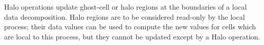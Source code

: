 

Halo operations update ghost-cell or halo regions at the boundaries
of a local data decomposition.  Halo regions are to be considered
read-only by the local process; their data values can be used to
compute the new values for cells which are local to this process,
but they cannot be updated except by a Halo operation.


